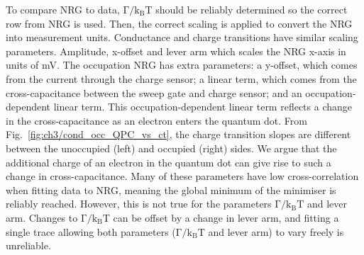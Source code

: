 To compare NRG to data, $\mathrm{\Gamma/k_BT}$ should be reliably determined so the correct row from NRG is used. Then, the correct scaling is applied to convert the NRG into measurement units. Conductance and charge transitions have similar scaling parameters. Amplitude, x-offset and lever arm which scales the NRG x-axis in units of mV. The occupation NRG has extra parameters: a y-offset, which comes from the current through the charge sensor; a linear term, which comes from the cross-capacitance between the sweep gate and charge sensor; and an occupation-dependent linear term. 
This occupation-dependent linear term reflects a change in the cross-capacitance as an electron enters the quantum dot. From Fig.~\ref{fig:ch3/cond_occ_QPC_vs_ct}, the charge transition slopes are different between the unoccupied (left) and occupied (right) sides. We argue that the additional charge of an electron in the quantum dot can give rise to such a change in cross-capacitance. Many of these parameters have low cross-correlation when fitting data to NRG, meaning the global minimum of the minimiser is reliably reached. However, this is not true for the parameters $\mathrm{\Gamma/k_BT}$ and lever arm. Changes to $\mathrm{\Gamma/k_BT}$ can be offset by a change in lever arm, and fitting a single trace allowing both parameters ($\mathrm{\Gamma/k_BT}$ and lever arm) to vary freely is unreliable. 

